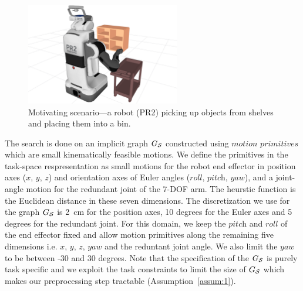 \documentclass[a4paper,10pt]{article}
\begin{document}
\begin{figure}[tb]
  \centering
    \includegraphics[width=0.6\textwidth]{pr2.png}
  \caption{
  Motivating scenario---a robot (PR2) picking up objects from shelves and placing them into a bin.
}
    \label{fig:PR2}
\end{figure}

The search is done on an implicit graph $G_\mathcal{S}$ constructed using $\textit{motion primitives}$ which are small kinematically feasible motions. We define the primitives in the task-space respresentation as small motions for the robot end effector in position axes ($\textit{x, y, z}$) and orientation axes of Euler angles ($\textit{roll, pitch, yaw}$), and a joint-angle motion for the redundant joint of the 7-DOF arm. 
The heurstic function is the Euclidean distance in these seven dimensions. The discretization we use for the graph $G_\mathcal{S}$ is 2~cm for the position axes, 10 degrees for the Euler axes and 5 degrees for the redundant joint. 
For this domain, we keep the $\textit{pitch}$ and $\textit{roll}$ of the end effector fixed and allow motion primitives along the remaining five dimensions i.e. $\textit{x, y, z, yaw}$ and the reduntant joint angle. We also limit the $\textit{yaw}$ to be between -30 and 30 degrees. Note that the specification of the $G_\mathcal{S}$ is purely task specific and we exploit the task constraints to limit the size of $G_\mathcal{S}$ which makes our preprocessing step tractable (Assumption~\ref{assum:1}).
\end{document}
